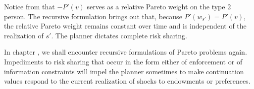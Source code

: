  Notice from
 that $-P'(v)$ serves as a   relative Pareto weight on
the type 2 person. The recursive formulation brings out that,
because $P'(w_{s'}) = P'(v)$,
 the relative  Pareto weight remains constant over time and is independent
of the  realization of $s'$.    The planner dictates
complete risk sharing.


In chapter , we shall encounter recursive formulations
of Pareto problems
again. Impediments to risk sharing that occur in the form
either of enforcement or of information constraints will
impel the planner sometimes to make continuation values respond
to the current realization of shocks to endowments or preferences.



